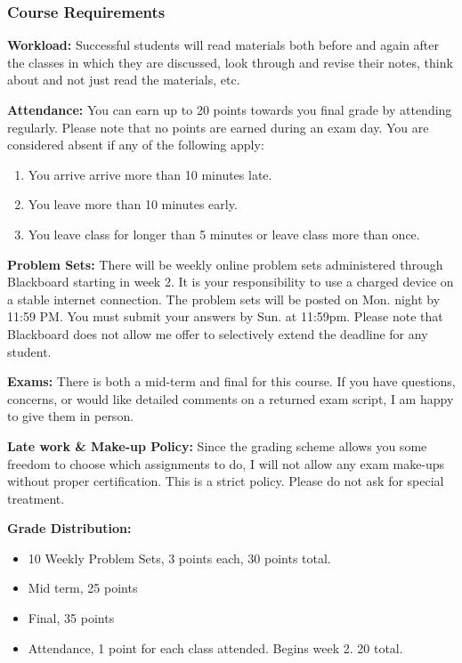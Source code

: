 \documentclass[]{article}
\begin{document}
\subsubsection{Course Requirements}\label{course-requirements}

\textbf{Workload:} Successful students will read materials both before
and again after the classes in which they are discussed, look through
and revise their notes, think about and not just read the materials,
etc.

\textbf{Attendance:} You can earn up to 20 points towards you final
grade by attending regularly. Please note that no points are earned
during an exam day. You are considered absent if any of the following
apply:

\begin{enumerate}
\def\labelenumi{\arabic{enumi}.}
\itemsep1pt\parskip0pt
\item
  You arrive arrive more than 10 minutes late.
\item
  You leave more than 10 minutes early.
\item
  You leave class for longer than 5 minutes or leave class more than
  once.
\end{enumerate}

\textbf{Problem Sets:} There will be weekly online problem sets
administered through Blackboard starting in week 2. It is your
responsibility to use a charged device on a stable internet connection.
The problem sets will be posted on Mon. night by 11:59 PM. You must
submit your answers by Sun. at 11:59pm. Please note that Blackboard does
not allow me offer to selectively extend the deadline for any student.

\textbf{Exams:} There is both a mid-term and final for this course. If
you have questions, concerns, or would like detailed comments on a
returned exam script, I am happy to give them in person.

\textbf{Late work \& Make-up Policy:} Since the grading scheme allows
you some freedom to choose which assignments to do, I will not allow any
exam make-ups without proper certification. This is a strict policy.
Please do not ask for special treatment.

\textbf{Grade Distribution:}


\begin{itemize}
\item 10 Weekly Problem Sets, 3 points each, 30 points total. 
\item Mid term, 25 points
\item Final, 35 points
\item Attendance, 1 point for each class attended. Begins week 2.  20 total.
\end{itemize}
\end{document}
